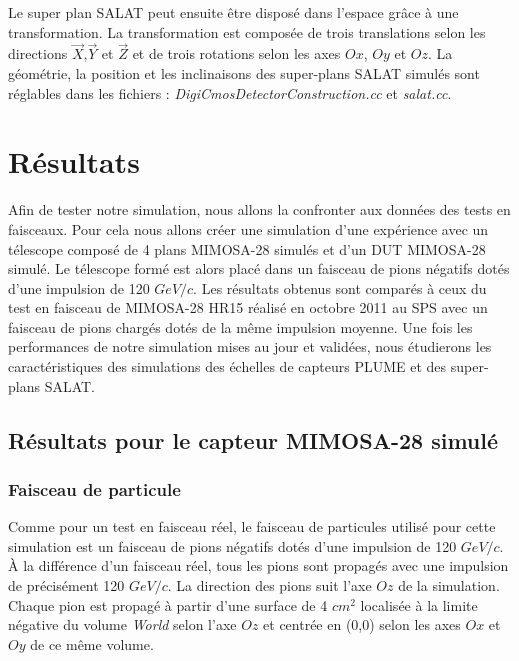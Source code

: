    Le super plan SALAT peut ensuite \^etre dispos\'e dans l'espace gr\^ace \`a une transformation. La transformation est compos\'ee de trois translations selon les directions $\overrightarrow{X}$,$\overrightarrow{Y}$ et $\overrightarrow{Z}$ et de trois rotations selon les axes $Ox$, $Oy$ et $Oz$. La g\'eom\'etrie, la position et les inclinaisons des super-plans SALAT simul\'es sont r\'eglables dans les fichiers  : \textit{DigiCmosDetectorConstruction.cc} et \textit{salat.cc}.
   
  
   \section{R\'esultats}
   \label{sect:resultatsSIMU}

   Afin de tester notre simulation, nous allons la confronter aux donn\'ees des tests en faisceaux. Pour cela nous allons cr\'eer une simulation d'une exp\'erience avec un t\'elescope compos\'e de 4 plans MIMOSA-28 simul\'es et d'un DUT MIMOSA-28 simul\'e. Le t\'elescope form\'e est alors plac\'e dans un faisceau de pions n\'egatifs dot\'es d'une impulsion de 120 $GeV/c$. Les r\'esultats obtenus sont compar\'es \`a ceux du test en faisceau de MIMOSA-28 HR15 r\'ealis\'e en octobre 2011 au SPS avec un faisceau de pions charg\'es dot\'es de la même impulsion moyenne. Une fois les performances de notre simulation mises au jour et valid\'ees, nous \'etudierons les caract\'eristiques des simulations des \'echelles de capteurs PLUME et des super-plans SALAT.

   
    \subsection{R\'esultats pour le capteur MIMOSA-28 simul\'e}
 
    \subsubsection{Faisceau de particule}
     
     Comme pour un test en faisceau r\'eel, le faisceau de particules utilis\'e pour cette simulation est un faisceau de pions n\'egatifs dot\'es d'une impulsion de 120 $GeV/c$. \`A la diff\'erence d'un faisceau r\'eel, tous les pions sont propag\'es avec une impulsion de pr\'ecis\'ement 120 $GeV/c$. La direction des pions suit l'axe $Oz$ de la simulation. Chaque pion est propag\'e \`a partir d'une surface de 4 $cm^2$ localis\'ee \`a la limite n\'egative du volume \textit{World} selon l'axe $Oz$ et centr\'ee en (0,0) selon les axes $Ox$ et $Oy$ de ce m\^eme volume.
     
